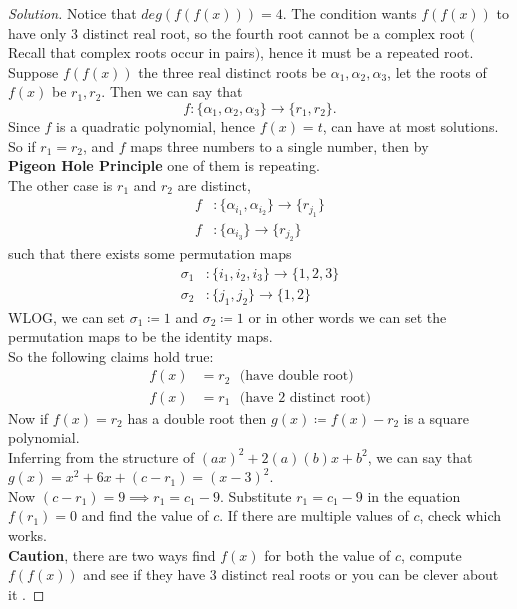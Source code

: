 \documentclass{scrartcl} %
\begin{document}
\begin{proof}[Solution]
Notice that $deg\left(f(f(x))\right) = 4$. The condition
wants $f(f(x))$ to have only 3 distinct real root, so
the fourth root cannot be a complex root $($Recall that
complex roots occur in pairs$)$, hence it must be a
repeated root.\\
Suppose $f(f(x))$ the three real distinct roots be
$\alpha_1, \alpha_2, \alpha_3$, let the roots of $f(x)$
be $r_1, r_2$.
Then we can say that \[
	f : \{\alpha_1, \alpha_2, \alpha_3\}
\rightarrow \{r_1, r_2\}.
\]
Since $f$ is a quadratic polynomial, hence $f(x) = t$, 
can have at most solutions.\\
So if $r_1 = r_2$, and $f$ maps three numbers to a 
single number, then by \\ \textbf{Pigeon Hole Principle}
one of them is repeating.\\
The other case is $r_1$ and $r_2$ are distinct,
\begin{align*}
	f &: \{\alpha_{i_1}, \alpha_{i_2}\} \rightarrow
 \{r_{j_1}\}\\
	f &: \{\alpha_{i_3}\} \rightarrow \{r_{j_2}\}
\end{align*}
such that there exists some permutation maps
\begin{align*}
	\sigma_1&: \{i_1,i_2,i_3\} \rightarrow \{1,2,3\}
	\\
	\sigma_2&: \{j_1,j_2\} \rightarrow \{1,2\}
\end{align*}
WLOG, we can set $\sigma_1 \coloneq 1$ and
$\sigma_2 \coloneq 1$ or in other words we can set the permutation maps to be the identity maps.\\
So the following claims hold true:
\begin{align*}
	f(x) &= r_2 \text{ $($have double root$)$}\\
	f(x) &= r_1 \text{ $($have 2 distinct root$)$}
\end{align*}
Now if $f(x) = r_2$ has a double root then 
$g(x) \coloneq f(x) - r_2$ is a square polynomial.\\
Inferring from the structure of $(ax)^2 + 2(a)(b)x + b^2
$, we can say that \\$g(x) = x^2 + 6x + (c-r_1) =(x - 3)^2
$.\\
Now $(c - r_1) = 9 \implies r_1 = c_1 - 9$. Substitute $r_1 = c_1 - 9$ in the equation $f(r_1) = 0$ and find the
value of $c$. If there are multiple values of $c$, check
which works.\\
\textbf{Caution}, there are two ways find $f(x)$ for
both the value of $c$, compute $f(f(x))$ and see if they
have 3 distinct real roots or you can be clever about it
.
\end{proof}
\end{document}
